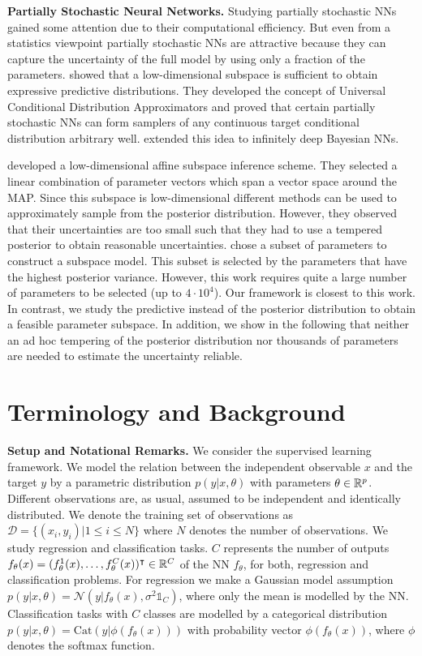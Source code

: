 \textbf{Partially Stochastic Neural Networks.} 
Studying partially stochastic NNs gained some attention due to their computational efficiency. But even from a statistics viewpoint partially stochastic NNs are attractive because they can capture the uncertainty of the full model by using only a fraction of the parameters. \cite{Sharma2023} showed that a low-dimensional subspace is sufficient to obtain expressive predictive distributions. They developed the concept of Universal Conditional Distribution Approximators and proved that certain partially stochastic NNs can form samplers of any continuous target conditional distribution arbitrary well. \cite{calvoordonez2024} extended this idea to infinitely deep Bayesian NNs.  

\cite{Izmailov2019} developed a low-dimensional affine subspace inference scheme. They selected a linear combination of parameter vectors which span a vector space around the MAP. Since this subspace is low-dimensional different methods can be used to approximately sample from the posterior distribution. However, they observed that their uncertainties are too small such that they had to use a tempered posterior to obtain reasonable uncertainties. 
\cite{Daxberger2021} chose a subset of parameters to construct a subspace model. This subset is selected by the parameters that have the highest posterior variance. However, this work requires quite a large number of parameters to be selected (up to $4\cdot 10^4$).
Our framework is closest to this work. In contrast, we study the predictive instead of the posterior distribution to obtain a feasible parameter subspace. In addition, we show in the following that neither an ad hoc tempering of the posterior distribution nor thousands of parameters are needed to estimate the uncertainty reliable.


\section{Terminology and Background}
\label{sec:terminlogy_and_background}
\textbf{Setup and Notational Remarks.}
We consider the supervised learning framework. We model the relation between the independent observable $x$ and the target $y$ by a parametric distribution $p(y | x, \theta)$ with parameters $\theta \in \mathbb{R}^p$. Different observations are, as usual, assumed to be independent and identically distributed.
We denote the training set of observations as $\mathcal{D} = \{(x_i,y_i) | 1 \leq i \leq N\}$ where $N$ denotes the number of observations.
We study regression and classification tasks. $C$ represents the number of outputs $f_\theta(x)=(f_\theta^1(x),\ldots, f_\theta^C(x))^\intercal\in \mathbb{R} ^C$ of the NN $f_\theta$, for both, regression and classification problems. For regression we make a Gaussian model assumption $p(y | x, \theta) = \mathcal{N}(y | f_{\theta}(x), \sigma^2\mathbb{1}_C)$, where only the mean is modelled by the NN. Classification tasks with $C$ classes are modelled by a categorical distribution $p(y|x,\theta)=\mathrm{Cat}\left(y | \phi(f_{\theta}(x))\right)$ with probability vector $\phi(f_{\theta}(x))$, where $\phi$ denotes the softmax function. 

